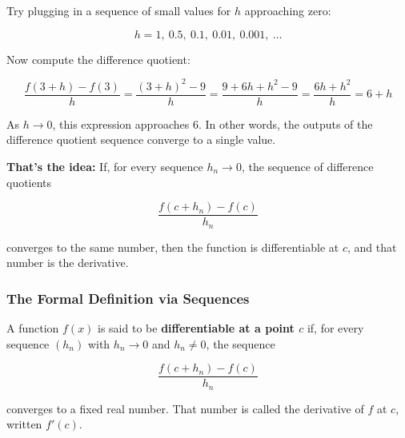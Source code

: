 Try plugging in a sequence of small values for \( h \) approaching zero:

\[
h = 1,\ 0.5,\ 0.1,\ 0.01,\ 0.001,\ \dots
\]

Now compute the difference quotient:

\[
\frac{f(3 + h) - f(3)}{h} = \frac{(3 + h)^2 - 9}{h}
= \frac{9 + 6h + h^2 - 9}{h} = \frac{6h + h^2}{h} = 6 + h
\]

As \( h \to 0 \), this expression approaches 6. In other words, the outputs of the difference quotient sequence converge to a single value.

\textbf{That’s the idea:} If, for every sequence \( h_n \to 0 \), the sequence of difference quotients

\[
\frac{f(c + h_n) - f(c)}{h_n}
\]

converges to the same number, then the function is differentiable at \( c \), and that number is the derivative.

\subsubsection{The Formal Definition via Sequences}

A function \( f(x) \) is said to be \textbf{differentiable at a point \( c \)} if, for every sequence \( (h_n) \) with \( h_n \to 0 \) and \( h_n \neq 0 \), the sequence

\[
\frac{f(c + h_n) - f(c)}{h_n}
\]

converges to a fixed real number. That number is called the derivative of \( f \) at \( c \), written \( f'(c) \).

\begin{center}
\end{center}

